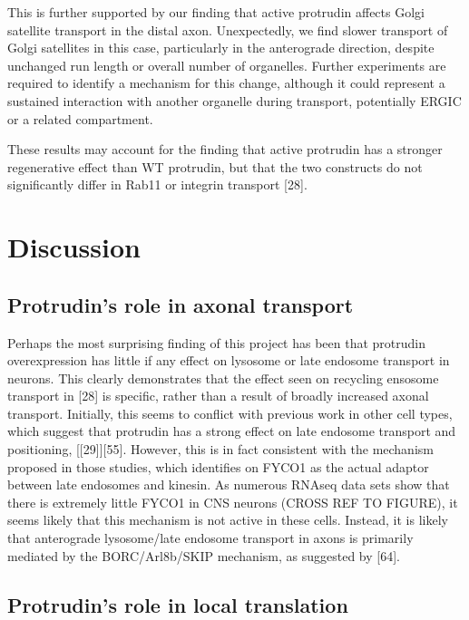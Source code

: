 \documentclass[
  12pt,
  a4paper,
]{book}
\begin{document}
This is further supported by our finding that active protrudin affects Golgi satellite transport in the distal axon. Unexpectedly, we find slower transport of Golgi satellites in this case, particularly in the anterograde direction, despite unchanged run length or overall number of organelles. Further experiments are required to identify a mechanism for this change, although it could represent a sustained interaction with another organelle during transport, potentially ERGIC or a related compartment.

These results may account for the finding that active protrudin has a stronger regenerative effect than WT protrudin, but that the two constructs do not significantly differ in Rab11 or integrin transport {[}28{]}.

\hypertarget{DISCUSSION}{%
\chapter*{Discussion}\label{DISCUSSION}}


\hypertarget{protrudins-role-in-axonal-transport}{%
\section{Protrudin's role in axonal transport}\label{protrudins-role-in-axonal-transport}}

Perhaps the most surprising finding of this project has been that protrudin overexpression has little if any effect on lysosome or late endosome transport in neurons. This clearly demonstrates that the effect seen on recycling ensosome transport in {[}28{]} is specific, rather than a result of broadly increased axonal transport. Initially, this seems to conflict with previous work in other cell types, which suggest that protrudin has a strong effect on late endosome transport and positioning, {[}{[}29{]}{]}{[}55{]}. However, this is in fact consistent with the mechanism proposed in those studies, which identifies on FYCO1 as the actual adaptor between late endosomes and kinesin. As numerous RNAseq data sets show that there is extremely little FYCO1 in CNS neurons (CROSS REF TO FIGURE), it seems likely that this mechanism is not active in these cells. Instead, it is likely that anterograde lysosome/late endosome transport in axons is primarily mediated by the BORC/Arl8b/SKIP mechanism, as suggested by {[}64{]}.

\hypertarget{protrudins-role-in-local-translation}{%
\section{Protrudin's role in local translation}\label{protrudins-role-in-local-translation}}
\end{document}
